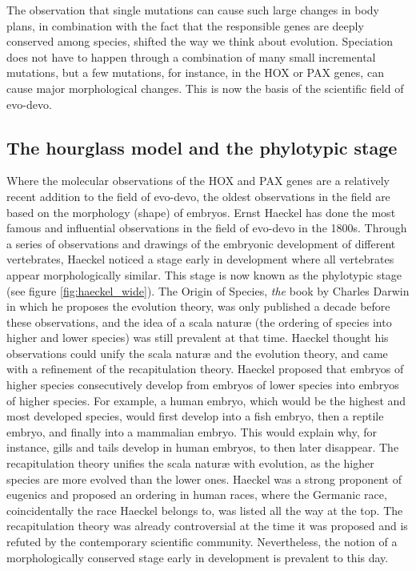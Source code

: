 The observation that single mutations can cause such large changes in body plans, in combination with the fact that the responsible genes are deeply conserved among species, shifted the way we think about evolution. Speciation does not have to happen through a combination of many small incremental mutations, but a few mutations, for instance, in the HOX or PAX genes, can cause major morphological changes. This is now the basis of the scientific field of evo-devo.

\subsection{The hourglass model and the phylotypic stage}

Where the molecular observations of the HOX and PAX genes are a relatively recent addition to the field of evo-devo, the oldest observations in the field are based on the morphology (shape) of embryos. Ernst Haeckel has done the most famous and influential observations in the field of evo-devo in the 1800s\cite{haeckel1866}. Through a series of observations and drawings of the embryonic development of different vertebrates, Haeckel noticed a stage early in development where all vertebrates appear morphologically similar. This stage is now known as the phylotypic stage (see figure \ref{fig:haeckel_wide}). The Origin of Species, \textit{the} book by Charles Darwin in which he proposes the evolution theory, was only published a decade before these observations, and the idea of a scala naturæ (the ordering of species into higher and lower species) was still prevalent at that time. Haeckel thought his observations could unify the scala naturæ and the evolution theory, and came with a refinement of the recapitulation theory. Haeckel proposed that embryos of higher species consecutively develop from embryos of lower species into embryos of higher species. For example, a human embryo, which would be the highest and most developed species, would first develop into a fish embryo, then a reptile embryo, and finally into a mammalian embryo. This would explain why, for instance, gills and tails develop in human embryos, to then later disappear. The recapitulation theory unifies the scala naturæ with evolution, as the higher species are more evolved than the lower ones. Haeckel was a strong proponent of eugenics and proposed an ordering in human races, where the Germanic race, coincidentally the race Haeckel belongs to, was listed all the way at the top\cite{Levit2020}. The recapitulation theory was already controversial at the time it was proposed and is refuted by the contemporary scientific community. Nevertheless, the notion of a morphologically conserved stage early in development is prevalent to this day.

